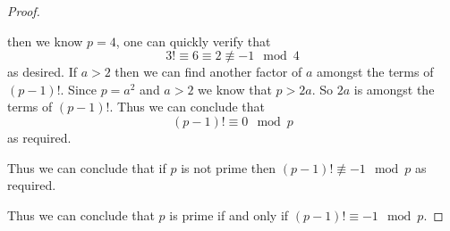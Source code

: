 \begin{proof}
\begin{itemize}
\begin{itemize}
                            then we know $p = 4$, one can quickly verify that
                            \[
                                3! \equiv 6 \equiv 2 \not\equiv -1 \mod 4
                            \]
                            as desired. If $a > 2$ then we can find another factor of $a$ amongst
                            the terms of $(p - 1)!$. Since $p = a^2$ and $a > 2$ we know that $p > 2a$.
                            So $2a$ is amongst the terms of $(p - 1)!$. Thus we can conclude that
                            \[
                                (p - 1)! \equiv 0 \mod p
                            \]
                            as required.
                    \end{itemize}
                    Thus we can conclude that if $p$ is not prime then $(p - 1)! \not\equiv -1 \mod p$
                    as required.
            \end{itemize}
            Thus we can conclude that $p$ is prime if and only if $(p - 1)! \equiv -1 \mod p$. \QED
        \end{proof}
